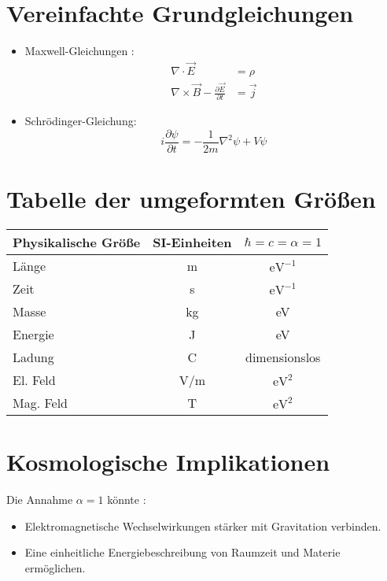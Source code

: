 \documentclass{article}
\begin{document}
	\section{Vereinfachte Grundgleichungen}
	\begin{itemize}
		\item Maxwell-Gleichungen \cite{Feynman1985}:
		\begin{align}
			\nabla \cdot \vec{E} &= \rho \\
			\nabla \times \vec{B} - \frac{\partial \vec{E}}{\partial t} &= \vec{j}
		\end{align}
		\item Schrödinger-Gleichung:
		\begin{equation}
			i \frac{\partial \psi}{\partial t} = -\frac{1}{2m} \nabla^2 \psi + V \psi
		\end{equation}
	\end{itemize}
	
	\section{Tabelle der umgeformten Größen}
	\begin{center}
		\begin{tabular}{|l|c|c|}
			\hline
			\textbf{Physikalische Größe} & \textbf{SI-Einheiten} & \textbf{\(\hbar = c = \alpha = 1\)} \\
			\hline
			Länge & m & \(\text{eV}^{-1}\) \\
			Zeit & s & \(\text{eV}^{-1}\) \\
			Masse & kg & eV \\
			Energie & J & eV \\
			Ladung & C & dimensionslos \\
			El. Feld & V/m & \(\text{eV}^2\) \\
			Mag. Feld & T & \(\text{eV}^2\) \\
			\hline
		\end{tabular}
	\end{center}
	
	\section{Kosmologische Implikationen}
	Die Annahme \(\alpha = 1\) könnte \cite{Verlinde2011}:
	\begin{itemize}
		\item Elektromagnetische Wechselwirkungen stärker mit Gravitation verbinden.
		\item Eine einheitliche Energiebeschreibung von Raumzeit und Materie ermöglichen.
	\end{itemize}
	
\end{document}
